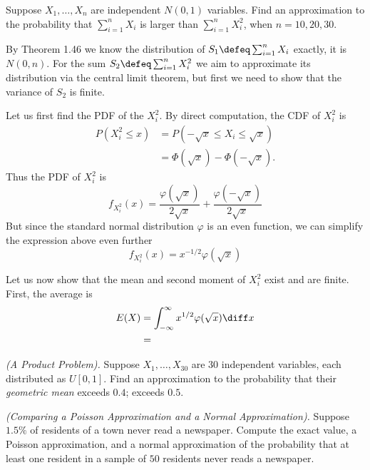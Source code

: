 \begin{problem}[Handout 14, \# 7]
  Suppose \(X_1,\dotsc,X_n\) are independent \(N(0,1)\) variables. Find an
  approximation to the probability that \(\sum_{i=1}^n X_i\) is larger than
  \(\sum_{i=1}^n X_i^2\), when \(n=10,20,30\).
\end{problem}
\begin{solution}
  By Theorem 1.46 we know the distribution of \(S_1\defeq\sum_{i=1}^n X_i\)
  exactly, it is \(N(0,n)\). For the sum \(S_2\defeq\sum_{i=1}^n X_i^2\) we
  aim to approximate its distribution via the central limit theorem, but
  first we need to show that the variance of \(S_2\) is finite.

  Let us first find the PDF of the \(X_i^2\). By direct computation, the
  CDF of \(X_i^2\) is
  \begin{align*}
    P(X_i^2\leq x)
    &=P\left(-\sqrt{x}\leq X_i\leq\sqrt{x}\right)\\
    &=\Phi(\sqrt{x})-\Phi(-\sqrt{x}).
  \end{align*}
  Thus the PDF of \(X_i^2\) is
  \[
    f_{X_i^2}(x)=\frac{\varphi(\sqrt{x})}{2\sqrt{x}}+\frac{\varphi(-\sqrt{x})}{2\sqrt{x}}
  \]
  But since the standard normal distribution \(\varphi\) is an even
  function, we can simplify the expression above even further
  \[
    f_{X_i^2}(x)=x^{-1/2}\varphi(\sqrt{x})
  \]

  Let us now show that the mean and second moment of \(X_i^2\) exist and
  are finite. First, the average is
  \begin{align*}
    E(X)
    &=\int_{-\infty}^\infty x^{1/2}\varphi(\sqrt{x})\diff x\\
    &=\
  \end{align*}
\end{solution}
\newpage

\begin{problem}[Handout 14, \# 8]
  \emph{(A Product Problem).} Suppose \(X_1,\dotsc,X_{30}\) are \(30\)
  independent variables, each distributed as \(U[0,1]\). Find an
  approximation to the probability that their \emph{geometric mean} exceeds
  \(0.4\); exceeds \(0.5\).
\end{problem}
\begin{solution}

\end{solution}
\newpage

\begin{problem}[Handout 14, \# 9]
  \emph{(Comparing a Poisson Approximation and a Normal Approximation).}
  Suppose \(1.5\%\) of residents of a town never read a newspaper. Compute
  the exact value, a Poisson approximation, and a normal approximation of
  the probability that at least one resident in a sample of \(50\)
  residents never reads a newspaper.
\end{problem}
\begin{solution}

\end{solution}
\newpage


